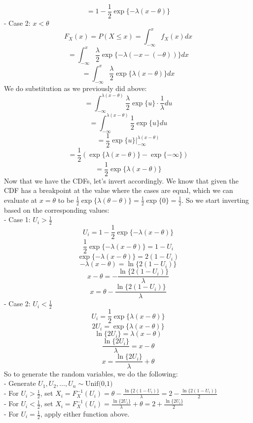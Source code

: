 \documentclass{article}
\begin{document}
{\[\]
\[
  = 1 - \frac{1}{2}\exp\{-\lambda(x - \theta)\}
\]
- Case 2: \(x < \theta\)
\[
  F_X(x) = P(X \leq x) = \int_{-\infty}^{x} f_X(x) dx 
\]
\[
  = \int_{-\infty}^{x} \frac{\lambda}{2}\exp\{-\lambda(-x-(-\theta))\} dx
\]
\[
  = \int_{-\infty}^{x} \frac{\lambda}{2}\exp\{\lambda(x-\theta)\} dx
\]
We do substitution as we previously did above:
\[
  = \int_{-\infty}^{\lambda(x-\theta)} \frac{\lambda}{2}\exp\{u\} \cdot \frac{1}{\lambda} du
\]
\[
  = \int_{-\infty}^{\lambda(x-\theta)} \frac{1}{2}\exp\{u\} du
\]
\[
  = \frac{1}{2}\exp\{u\} |_{-\infty}^{\lambda(x-\theta)}
\]
\[
  = \frac{1}{2}(\exp\{\lambda(x-\theta)\} - \exp\{-\infty\})
\]
\[
  = \frac{1}{2}\exp\{\lambda(x-\theta)\}
\]
Now that we have the CDFs, let's invert accordingly. We know that given the CDF has a breakpoint at the value where the cases are equal, which we can evaluate at \(x = \theta\) to be \(\frac{1}{2}\exp\{\lambda(\theta-\theta)\} = \frac{1}{2}\exp\{0\} = \frac{1}{2}\). So we start inverting based on the corresponding values: \\
- Case 1: \(U_i > \frac{1}{2} \) \\
\[
  U_i = 1 - \frac{1}{2}\exp\{-\lambda(x - \theta)\}
\]
\[
  \frac{1}{2}\exp\{-\lambda(x - \theta)\} = 1 - U_i
\]
\[
  \exp\{-\lambda(x - \theta)\} = 2(1 - U_i)
\]
\[
  -\lambda(x - \theta) = \ln\{2(1 - U_i)\}
\]
\[
  x - \theta = -\frac{\ln\{2(1 - U_i)\}}{\lambda}
\]
\[
  x = \theta -\frac{\ln\{2(1 - U_i)\}}{\lambda}
\]
- Case 2: \(U_i < \frac{1}{2} \) \\
\[
  U_i = \frac{1}{2}\exp\{\lambda(x-\theta)\}
\]
\[
  2U_i = \exp\{\lambda(x-\theta)\}
\]
\[
  \ln\{2U_i\} = \lambda(x-\theta)
\]
\[
  \frac{\ln\{2U_i\}}{\lambda} = x - \theta
\]
\[
  x = \frac{\ln\{2U_i\}}{\lambda} + \theta
\]
So to generate the random variables, we do the following: \\
- Generate \(U_1, U_2, \dots, U_n \sim \text{Unif(0,1)}\) \\ 
- For \(U_i > \frac{1}{2}\), set \(X_i = F^{-1}_X(U_i) = \theta - \frac{\ln\{2(1 - U_i)\}}{\lambda} = 2 - \frac{\ln\{2(1 - U_i)\}}{2}\) \\
- For \(U_i < \frac{1}{2}\), set \(X_i = F^{-1}_X(U_i) = \frac{\ln\{2U_i\}}{\lambda} + \theta = 2 + \frac{\ln\{2U_i\}}{2}\) \\
- For \(U_i = \frac{1}{2}\), apply either function above.

}
\end{document}
